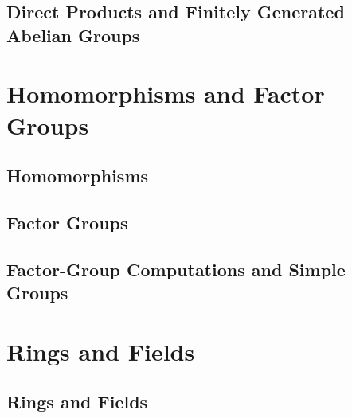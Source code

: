 \documentclass[11pt]{article}
\begin{document}
\subsection{Direct Products and Finitely Generated Abelian Groups}


\section{Homomorphisms and Factor Groups}
\setcounter{subsection}{12}
\subsection{Homomorphisms}
\subsection{Factor Groups}
\subsection{Factor-Group Computations and Simple Groups}


\section{Rings and Fields}
\setcounter{subsection}{17}
\subsection{Rings and Fields}
\end{document}
